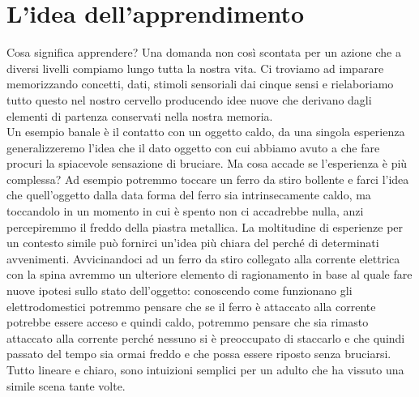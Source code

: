 \section{L'idea dell'apprendimento}
Cosa significa apprendere? Una domanda non così scontata per un azione che a diversi livelli compiamo lungo tutta la nostra vita. Ci troviamo ad imparare memorizzando concetti, dati, stimoli sensoriali dai cinque sensi e rielaboriamo tutto questo nel nostro cervello producendo idee nuove che derivano dagli elementi di partenza conservati nella nostra memoria.
\\ 
Un esempio banale è il contatto con un oggetto caldo, da una singola esperienza generalizzeremo l'idea che il dato oggetto con cui abbiamo avuto a che fare procuri la spiacevole sensazione di bruciare. Ma cosa accade se l'esperienza è più complessa? Ad esempio potremmo toccare un ferro da stiro bollente e farci l'idea che quell'oggetto dalla data forma del ferro sia intrinsecamente caldo, ma toccandolo in un momento in cui è spento non ci accadrebbe nulla, anzi percepiremmo il freddo della piastra metallica. La moltitudine di esperienze per un contesto simile può fornirci un'idea più chiara del perché di determinati avvenimenti. Avvicinandoci ad un ferro da stiro collegato alla corrente elettrica con la spina avremmo un ulteriore elemento di ragionamento in base al quale fare nuove ipotesi sullo stato dell'oggetto: conoscendo come funzionano gli elettrodomestici potremmo pensare che se il ferro è attaccato alla corrente potrebbe essere acceso e quindi caldo, potremmo pensare che sia rimasto attaccato alla corrente perché nessuno si è preoccupato di staccarlo e che quindi passato del tempo sia ormai freddo e che possa essere riposto senza bruciarsi. Tutto lineare e chiaro, sono intuizioni semplici per un adulto che ha vissuto una simile scena tante volte. 
\\
